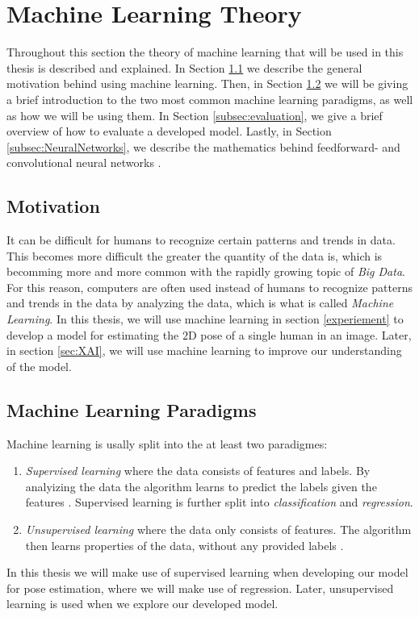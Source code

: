 \documentclass[./main.tex]{subfiles}
\begin{document}
\section{Machine Learning Theory}\label{sec:theory}
Throughout this section the theory of machine learning that will be used in this thesis is described and explained. In Section \ref{subsec:motivation_theory} we describe the general motivation behind using machine learning. Then, in Section \ref{subsec:ml_paradigmes} we will be giving a brief introduction to the two most common machine learning paradigms, as well as how we will be using them. In Section \ref{subsec:evaluation}, we give a brief overview of how to evaluate a developed model. Lastly, in Section \ref{subsec:NeuralNetworks}, we describe the mathematics behind feedforward- and convolutional neural networks .

\subsection{Motivation}\label{subsec:motivation_theory}
It can be difficult for humans to recognize certain patterns and trends in data. This becomes more difficult the greater the quantity of the data is, which is becomming more and more common with the rapidly growing topic of \textit{Big Data}. For this reason, computers are often used instead of humans to recognize patterns and trends in the data by analyzing the data, which is what is called \textit{Machine Learning}. In this thesis, we will use machine learning in section \ref{experiement} to develop a model for estimating the $2$D pose of a single human in an image. Later, in section \ref{sec:XAI}, we will use machine learning to improve our understanding of the model.

\subsection{Machine Learning Paradigms}\label{subsec:ml_paradigmes}
Machine learning is usally split into the at least two paradigmes:
\begin{enumerate}
    \item \textit{Supervised learning} where the data consists of features and labels. By analyizing the data the algorithm learns to predict the labels given the features \cite{ESL}. Supervised learning is further split into \textit{classification} and \textit{regression}.
    \item \textit{Unsupervised learning} where the data only consists of features. The algorithm then learns properties of the data, without any provided labels \cite{ESL}.
\end{enumerate}
In this thesis we will make use of supervised learning when developing our model for pose estimation, where we will make use of regression. Later, unsupervised learning is used when we explore our developed model.
\end{document}
